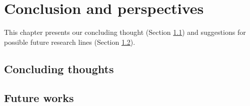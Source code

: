 \chapter{Conclusion and perspectives}
\label{chap:concl}
 
This chapter presents our concluding thought (Section \ref{sec:concl}) and 
suggestions for possible future research lines (Section \ref{sec:future}).
\section{Concluding thoughts}
\label{sec:concl}
\section{Future works}
\label{sec:future}
